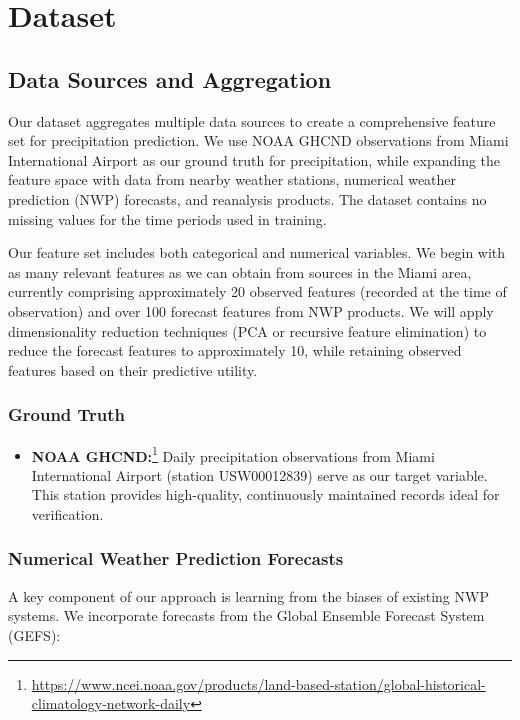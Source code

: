 \documentclass[11pt]{article}
\begin{document}
\section{Dataset}

\subsection{Data Sources and Aggregation}

Our dataset aggregates multiple data sources to create a comprehensive feature set for precipitation prediction. We use NOAA GHCND observations from Miami International Airport as our ground truth for precipitation, while expanding the feature space with data from nearby weather stations, numerical weather prediction (NWP) forecasts, and reanalysis products. The dataset contains no missing values for the time periods used in training.

Our feature set includes both categorical and numerical variables. We begin with as many relevant features as we can obtain from sources in the Miami area, currently comprising approximately 20 observed features (recorded at the time of observation) and over 100 forecast features from NWP products. We will apply dimensionality reduction techniques (PCA or recursive feature elimination) to reduce the forecast features to approximately 10, while retaining observed features based on their predictive utility.

\subsubsection{Ground Truth}
\begin{itemize}
    \item \textbf{NOAA GHCND:}\footnote{\url{https://www.ncei.noaa.gov/products/land-based-station/global-historical-climatology-network-daily}} Daily precipitation observations from Miami International Airport (station USW00012839) serve as our target variable. This station provides high-quality, continuously maintained records ideal for verification.
\end{itemize}

\subsubsection{Numerical Weather Prediction Forecasts}

A key component of our approach is learning from the biases of existing NWP systems. We incorporate forecasts from the Global Ensemble Forecast System (GEFS):
\end{document}
